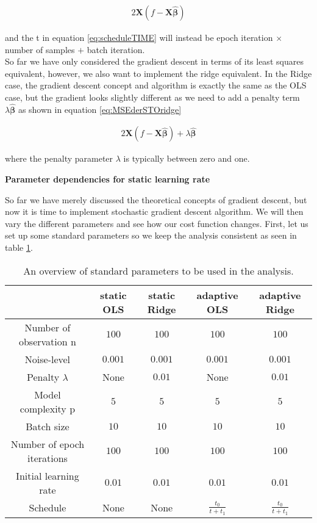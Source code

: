 \documentclass[12pt,a4paper]{article}
\begin{document}
\begin{equation}\label{eq:MSEderSTO}
\begin{aligned}
2 \textbf{X}(f - \textbf{X}\boldsymbol{\hat{\beta}}) 
\end{aligned}
\end{equation}

\noindent and the t in equation \ref{eq:scheduleTIME} will instead be epoch iteration $\times$ number of samples $+$ batch iteration.
\\
So far we have only considered the gradient descent in terms of its least squares equivalent, however, we also want to implement the ridge equivalent. In the Ridge case, the gradient descent concept and algorithm is exactly the same as the OLS case, but the gradient looks slightly different as we need to add a penalty term $\lambda \boldsymbol{\hat{\beta}}$ as shown in equation \ref{eq:MSEderSTOridge}

\begin{equation}\label{eq:MSEderSTOridge}
\begin{aligned}
2 \textbf{X}(f - \textbf{X}\boldsymbol{\hat{\beta}}) + \lambda \boldsymbol{\hat{\beta}}
\end{aligned}
\end{equation}

\noindent where the penalty parameter $\lambda$ is typically between zero and one. 

\begin{center}
\large{\textbf{Parameter dependencies for static learning rate}}
\end{center}

\noindent So far we have merely discussed the theoretical concepts of gradient descent, but now it is time to implement stochastic gradient descent algorithm. We will then vary the different parameters and see how our cost function changes. First, let us set up some standard parameters so we keep the analysis consistent as seen in table \ref{tab:standardParam}.

\begin{table}[h]
\caption{\label{tab:standardParam} An overview of standard parameters to be used in the analysis.}
\centering
\begin{tabular}{c|c|c|c|c}
 & static OLS & static Ridge & adaptive OLS & adaptive Ridge\\
\hline
Number of observation n & $100$ & $100$ & $100$ & $100$\\
\hline
Noise-level & $0.001$ & $0.001$ & $0.001$ & $0.001$\\
\hline
Penalty $\lambda$ & None & $0.01$ & None & $0.01$\\
\hline
Model complexity p & $5$ & $5$ & $5$ & $5$\\
\hline
Batch size & $10$ & $10$ & $10$ & $10$\\
\hline
Number of epoch iterations & $100$ & $100$ & $100$ & $100$\\
\hline
Initial learning rate & $0.01$ & $0.01$ & $0.01$ & $0.01$\\
\hline
Schedule & None & None & $\frac{t_0}{t+t_1}$ & $\frac{t_0}{t+t_1}$\\
\end{tabular}
\end{table}
\end{document}
